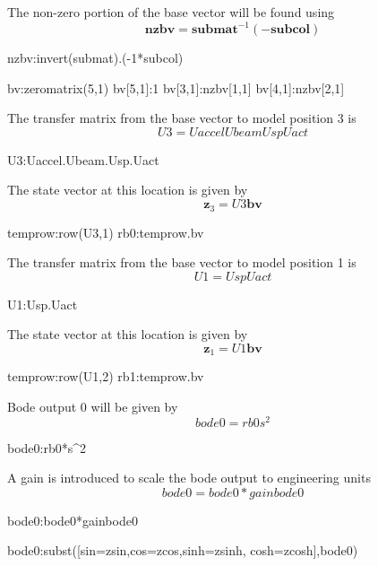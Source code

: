 \documentclass[12pt]{article}
\newcommand{\M}[1]{\mathbf{#1}}
\begin{document}
The non-zero portion of the base vector will be found using
\begin{equation}
\M{nzbv}=\M{submat}^{-1}\left(-\M{subcol}\right)
\end{equation}
\begin{maxima-noout}
	nzbv:invert(submat).(-1*subcol)
\end{maxima-noout}
\begin{maxima-noout}
bv:zeromatrix(5,1)
bv[5,1]:1
bv[3,1]:nzbv[1,1]
bv[4,1]:nzbv[2,1]
\end{maxima-noout}
The transfer matrix from the base vector to model position 3 is
\begin{equation}
	U3=Uaccel Ubeam Usp Uact
\end{equation}
\begin{maxima-noout}
	U3:Uaccel.Ubeam.Usp.Uact
\end{maxima-noout}
The state vector at this location is given by
\begin{equation}
	\M{z}_{3}=U3 \M{bv}
\end{equation}
\begin{maxima-noout}
	temprow:row(U3,1)
	rb0:temprow.bv
\end{maxima-noout}
The transfer matrix from the base vector to model position 1 is
\begin{equation}
	U1=Usp Uact
\end{equation}
\begin{maxima-noout}
	U1:Usp.Uact
\end{maxima-noout}
The state vector at this location is given by
\begin{equation}
	\M{z}_{1}=U1 \M{bv}
\end{equation}
\begin{maxima-noout}
	temprow:row(U1,2)
	rb1:temprow.bv
\end{maxima-noout}
Bode output 0 will be given by
\begin{equation}
	bode0=rb0 s^2
\end{equation}
\begin{maxima-noout}
bode0:rb0*s^2
\end{maxima-noout}
A gain is introduced to scale the bode output to engineering units
\begin{equation}
	bode0=bode0*gainbode0
\end{equation}
\begin{maxima-noout}
	bode0:bode0*gainbode0
\end{maxima-noout}
\begin{maxima-noout}
	bode0:subst([sin=zsin,cos=zcos,sinh=zsinh, cosh=zcosh],bode0)
\end{maxima-noout}
\end{document}
